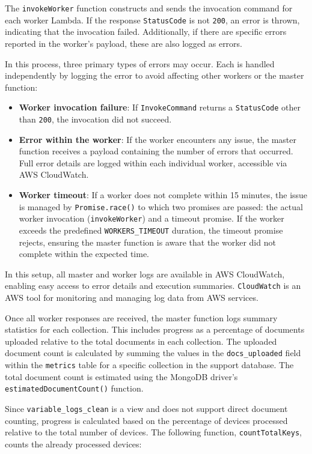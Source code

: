 The \texttt{invokeWorker} function constructs and sends the invocation command for each worker Lambda. If the response \texttt{StatusCode} is not \texttt{200}, an error is thrown, indicating that the invocation failed. Additionally, if there are specific errors reported in the worker's payload, these are also logged as errors.

In this process, three primary types of errors may occur. Each is handled independently by logging the error to avoid affecting other workers or the master function:
\begin{itemize}
    \item \textbf{Worker invocation failure}: If \texttt{InvokeCommand} returns a \texttt{StatusCode} other than \texttt{200}, the invocation did not succeed.
    \item \textbf{Error within the worker}: If the worker encounters any issue, the master function receives a payload containing the number of errors that occurred. Full error details are logged within each individual worker, accessible via AWS CloudWatch.
    \item \textbf{Worker timeout}: If a worker does not complete within 15 minutes, the issue is managed by \texttt{Promise.race()} to which two promises are passed: the actual worker invocation (\texttt{invokeWorker}) and a timeout promise. If the worker exceeds the predefined \texttt{WORKERS\_TIMEOUT} duration, the timeout promise rejects, ensuring the master function is aware that the worker did not complete within the expected time.
\end{itemize}

In this setup, all master and worker logs are available in AWS CloudWatch, enabling easy access to error details and execution summaries. \texttt{CloudWatch} is an AWS tool for monitoring and managing log data from AWS services. 

Once all worker responses are received, the master function logs summary statistics for each collection. This includes progress as a percentage of documents uploaded relative to the total documents in each collection. The uploaded document count is calculated by summing the values in the \texttt{docs\_uploaded} field within the \texttt{metrics} table for a specific collection in the support database. The total document count is estimated using the MongoDB driver's \texttt{estimatedDocumentCount()} function.

Since \texttt{variable\_logs\_clean} is a view and does not support direct document counting, progress is calculated based on the percentage of devices processed relative to the total number of devices. The following function, \texttt{countTotalKeys}, counts the already processed devices:


